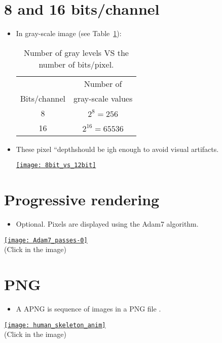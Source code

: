 \section{8 and 16 bits/channel}
\begin{itemize}
\item In gray-scale image (see Table~\ref{tab:gray_levels}):
  \begin{table}[!h]
    \vspace{2ex}
    \begin{center}
      \begin{tabular}{c|c}
        & Number of \\
        Bits/channel & gray-scale values \\
        \hline
        8 & $2^8=256$ \\
        16 & $2^{16}=65536$
      \end{tabular}
    \vspace{2ex}
    \end{center}
    \caption{Number of gray levels VS the number of bits/pixel.}
    \label{tab:gray_levels}
  \end{table}
  \newpage
\item These pixel ``depthshould be igh enough to avoid visual artifacts.
  \vspace{-2ex}
  \begin{center}
    \href{https://www.fastcompression.com/blog/jpeg2000-applications-part1.htm}{\texttt{[image: 8bit\_vs\_12bit]}}
  \end{center}
\end{itemize}

\section{Progressive rendering}
\begin{itemize}
\item Optional. Pixels are displayed using the Adam7 algorithm.
\end{itemize}
\begin{center}
  \href{https://upload.wikimedia.org/wikipedia/commons/2/27/Adam7_passes.gif}{\texttt{[image: Adam7\_passes-0]}} \\
  (Click in the image)
\end{center}
  
\section{ PNG}
\begin{itemize}
\item A \gls{APNG} is sequence of images in a \gls{PNG} file
  \cite{wikipedia_APNG}.
\end{itemize}
\begin{center}
  \href{https://commons.wikimedia.org/wiki/Category:Animated_PNG_files#/media/File:201805_human_skeleton_anim.png}{\texttt{[image: human\_skeleton\_anim]}} \\
  (Click in the image)
\end{center}

